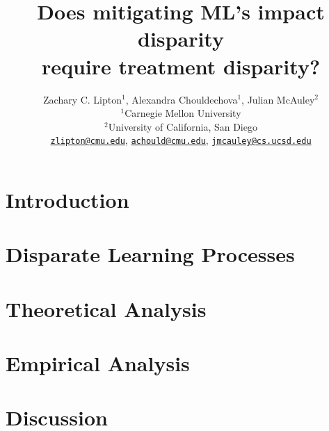 \documentclass{article}
\title{Does mitigating ML's impact disparity \\
require treatment disparity?
}
\author{Zachary C. Lipton$^1$, Alexandra Chouldechova$^1$,
Julian McAuley$^2$\\
$^1$Carnegie Mellon University\\
$^2$University of California, San Diego\\
 \href{mailto:zlipton@cmu.edu}{\nolinkurl{zlipton@cmu.edu}},
   \href{mailto:acould@cmu.edu}{\nolinkurl{achould@cmu.edu}},
    \href{mailto:jmcauley@cs.ucsd.edu}{\nolinkurl{jmcauley@cs.ucsd.edu}}
}
\begin{document}
\maketitle


\begin{abstract}

\end{abstract}



\section{Introduction}
\label{section:intro}


% 

\section{Disparate Learning Processes}
\label{section:fairness-algos}


\section{Theoretical Analysis}
\label{section:theory}


\section{Empirical Analysis}
\label{section:empirical}


% 

\section{Discussion}
\label{section:discussion}





\end{document}
